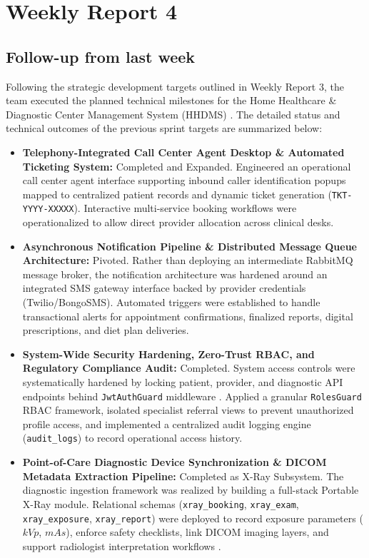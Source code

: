 \documentclass[onecolumn,journal]{IEEEtran}
\begin{document}
	\section{Weekly Report 4}
	
	\subsection{Follow-up from last week}
	Following the strategic development targets outlined in Weekly Report 3, the team executed the planned technical milestones for the Home Healthcare \& Diagnostic Center Management System (HHDMS) \cite{srs2026}. The detailed status and technical outcomes of the previous sprint targets are summarized below:
	\begin{itemize}
		\item \textbf{Telephony-Integrated Call Center Agent Desktop \& Automated Ticketing System:} Completed and Expanded. Engineered an operational call center agent interface supporting inbound caller identification popups mapped to centralized patient records and dynamic ticket generation (\texttt{TKT-YYYY-XXXXX}). Interactive multi-service booking workflows were operationalized to allow direct provider allocation across clinical desks.
		\item \textbf{Asynchronous Notification Pipeline \& Distributed Message Queue Architecture:} Pivoted. Rather than deploying an intermediate RabbitMQ message broker, the notification architecture was hardened around an integrated SMS gateway interface backed by provider credentials (Twilio/BongoSMS). Automated triggers were established to handle transactional alerts for appointment confirmations, finalized reports, digital prescriptions, and diet plan deliveries.
		\item \textbf{System-Wide Security Hardening, Zero-Trust RBAC, and Regulatory Compliance Audit:} Completed. System access controls were systematically hardened by locking patient, provider, and diagnostic API endpoints behind \texttt{JwtAuthGuard} middleware \cite{jones2015jwt}. Applied a granular \texttt{RolesGuard} RBAC framework, isolated specialist referral views to prevent unauthorized profile access, and implemented a centralized audit logging engine (\texttt{audit\_logs}) to record operational access history.
		\item \textbf{Point-of-Care Diagnostic Device Synchronization \& DICOM Metadata Extraction Pipeline:} Completed as X-Ray Subsystem. The diagnostic ingestion framework was realized by building a full-stack Portable X-Ray module. Relational schemas (\texttt{xray\_booking}, \texttt{xray\_exam}, \texttt{xray\_exposure}, \texttt{xray\_report}) were deployed to record exposure parameters ($kVp$, $mAs$), enforce safety checklists, link DICOM imaging layers, and support radiologist interpretation workflows \cite{dicom2021}.

\end{itemize}
\end{document}
